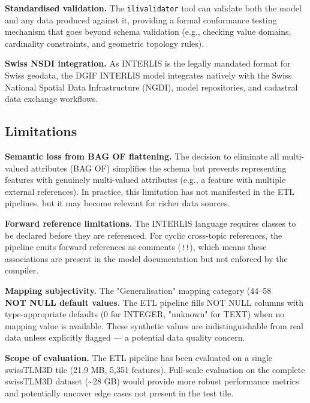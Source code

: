 \documentclass[conference]{IEEEtran}
\begin{document}
\textbf{Standardised validation.} The \texttt{ilivalidator} tool can validate both the model and any data produced against it, providing a formal conformance testing mechanism that goes beyond schema validation (e.g., checking value domains, cardinality constraints, and geometric topology rules).

\textbf{Swiss NSDI integration.} As INTERLIS is the legally mandated format for Swiss geodata, the DGIF INTERLIS model integrates natively with the Swiss National Spatial Data Infrastructure (NGDI), model repositories, and cadastral data exchange workflows.

\subsection{Limitations}

\textbf{Semantic loss from BAG OF flattening.} The decision to eliminate all multi-valued attributes (BAG OF) simplifies the schema but prevents representing features with genuinely multi-valued attributes (e.g., a feature with multiple external references). In practice, this limitation has not manifested in the ETL pipelines, but it may become relevant for richer data sources.

\textbf{Forward reference limitations.} The INTERLIS language requires classes to be declared before they are referenced. For cyclic cross-topic references, the pipeline emits forward references as comments (\texttt{!!}), which means these associations are present in the model documentation but not enforced by the compiler.

\textbf{Mapping subjectivity.} The "Generalisation" mapping category (44–58\\%

\textbf{NOT NULL default values.} The ETL pipeline fills NOT NULL columns with type-appropriate defaults (0 for INTEGER, "unknown" for TEXT) when no mapping value is available. These synthetic values are indistinguishable from real data unless explicitly flagged — a potential data quality concern.

\textbf{Scope of evaluation.} The ETL pipeline has been evaluated on a single swissTLM3D tile (21.9 MB, 5,351 features). Full-scale evaluation on the complete swissTLM3D dataset (\textasciitilde{}28 GB) would provide more robust performance metrics and potentially uncover edge cases not present in the test tile.
\end{document}
